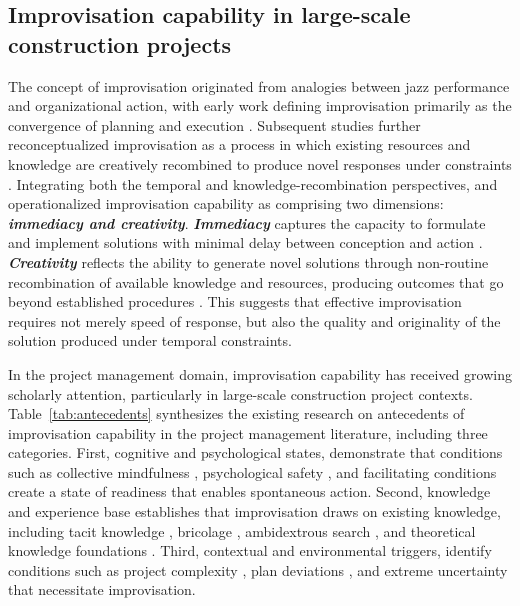 \documentclass[authoryear,preprint,review,times,10pt]{elsarticle}
\begin{document}
\subsection{Improvisation capability in large-scale construction projects}
The concept of improvisation originated from analogies between jazz performance and organizational action, with early work defining improvisation primarily as the convergence of planning and execution \citep{moorman1998Organizational}. Subsequent studies further reconceptualized improvisation as a process in which existing resources and knowledge are creatively recombined to produce novel responses under constraints \citep{miner2001Organizational, crossan2003Making}. Integrating both the temporal and knowledge-recombination perspectives, \citet{veranghg2005Improvisation} and \citet{magni2009Role} operationalized improvisation capability as comprising two dimensions: \textbf{\textit{immediacy and creativity}}. \textbf{\textit{Immediacy}} captures the capacity to formulate and implement solutions with minimal delay between conception and action \citep{veranghg2005Improvisation}. \textbf{\textit{Creativity}} reflects the ability to generate novel solutions through non-routine recombination of available knowledge and resources, producing outcomes that go beyond established procedures \citep{magni2009Role}. This suggests that effective improvisation requires not merely speed of response, but also the quality and originality of the solution produced under temporal constraints. 

In the project management domain, improvisation capability has received growing scholarly attention, particularly in large-scale construction project contexts. Table~\ref{tab:antecedents} synthesizes the existing research on antecedents of improvisation capability in the project management literature, including three categories. First, cognitive and psychological states, demonstrate that conditions such as collective mindfulness \citep{jiang2025Confronting, wang2025Formalization}, psychological safety \citep{huang2026Thriving}, and facilitating conditions \citep{coulon2026Wing} create a state of readiness that enables spontaneous action. Second, knowledge and experience base establishes that improvisation draws on existing knowledge, including tacit knowledge \citep{sumbal2025Improvisation}, bricolage \citep{xie2025How}, ambidextrous search \citep{rui2022Contingent}, and theoretical knowledge foundations \citep{klein2015Improvisation, nisula2016Role}. Third, contextual and environmental triggers, identify conditions such as project complexity \citep{mamedio2020Managing, jiang2023Toward}, plan deviations \citep{hamzeh2018Investigating, vuorinen2019Lifecycle}, and extreme uncertainty \citep{hacker2019Legitimizing, malucelli2021Facing} that necessitate improvisation. 
\end{document}
